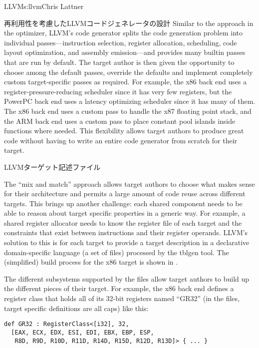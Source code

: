 \begin{aosachapter}{LLVM}{s:llvm}{Chris Lattner}
\begin{aosasect1}{再利用性を考慮したLLVMコードジェネレータの設計}
Similar to the approach in the optimizer, LLVM's code generator splits
the code generation problem into individual passes---instruction
selection, register allocation, scheduling, code layout optimization,
and assembly emission---and provides many builtin passes that are run
by default.  The target author is then given the opportunity to choose
among the default passes, override the defaults and implement
completely custom target-specific passes as required.  For example,
the x86 back end uses a register-pressure-reducing scheduler since it
has very few registers, but the PowerPC back end uses a latency
optimizing scheduler since it has many of them.  The x86 back end uses
a custom pass to handle the x87 floating point stack, and the ARM
back end uses a custom pass to place constant pool islands inside
functions where needed.  This flexibility allows target authors to
produce great code without having to write an entire code generator
from scratch for their target.

\begin{aosasect2}{LLVMターゲット記述ファイル}

The ``mix and match'' approach allows target authors to choose what
makes sense for their architecture and permits a large amount of code
reuse across different targets.  This brings up another challenge:
each shared component needs to be able to reason about target specific
properties in a generic way. For example, a shared register allocator
needs to know the register file of each target and the constraints
that exist between instructions and their register operands.  LLVM's
solution to this is for each target to provide a target description in
a declarative domain-specific language (a set of  files)
processed by the tblgen tool.  The (simplified) build process for the
x86 target is shown in .


The different subsystems supported by the  files allow
target authors to build up the different pieces of their target. For
example, the x86 back end defines a register class that holds all of
its 32-bit registers named ``GR32'' (in the  files, target
specific definitions are all caps) like this:

\begin{verbatim}
def GR32 : RegisterClass<[i32], 32,
  [EAX, ECX, EDX, ESI, EDI, EBX, EBP, ESP,
   R8D, R9D, R10D, R11D, R14D, R15D, R12D, R13D]> { ... }
\end{verbatim}


\end{aosasect2}
\end{aosasect1}
\end{aosachapter}
